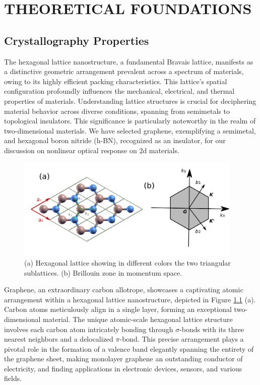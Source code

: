 \chapter{THEORETICAL FOUNDATIONS} 
\label{ch:ch2}
\section{Crystallography Properties}
The hexagonal lattice nanostructure, a fundamental Bravais lattice, manifests as a distinctive geometric arrangement prevalent across a spectrum of materials, owing to its highly efficient packing characteristics. This lattice's spatial configuration profoundly influences the mechanical, electrical, and thermal properties of materials. Understanding lattice structures is crucial for deciphering material behavior across diverse conditions, spanning from semimetals to topological insulators. This significance is particularly noteworthy in the realm of two-dimensional materials. We have selected graphene, exemplifying a semimetal, and hexagonal boron nitride (h-BN), recognized as an insulator, for our discussion on nonlinear optical response on 2d materials.\\
\begin{figure}[htpb]
    \centering
    \includegraphics[width=0.96\textwidth]{pic/lattice.pdf}
    \caption[Lab coordinate system]{(a) Hexagonal lattice showing in different colors the two triangular sublattices. (b) Brillouin zone in momentum space.}
    \label{fig: lattice}
\end{figure}
Graphene, an extraordinary carbon allotrope, showcases a captivating atomic arrangement within a hexagonal lattice nanostructure, depicted in Figure \ref{fig: lattice} (a). Carbon atoms meticulously align in a single layer, forming an exceptional two-dimensional material. The unique atomic-scale hexagonal lattice structure involves each carbon atom intricately bonding through $\sigma$-bonds with its three nearest neighbors and a delocalized $\pi$-bond. This precise arrangement plays a pivotal role in the formation of a valence band elegantly spanning the entirety of the graphene sheet, making monolayer graphene an outstanding conductor of electricity, and finding applications in electronic devices, sensors, and various fields.

